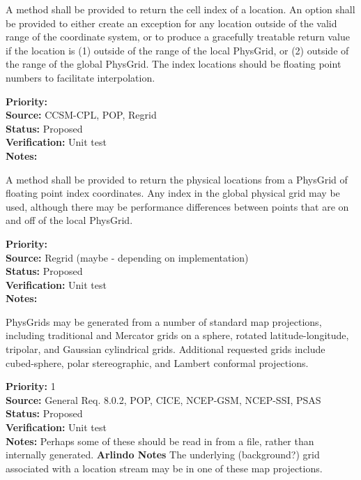 A method shall be provided to return the cell index of a location.  An option shall
be provided to either create an exception for any location outside of the valid
range of the coordinate system, or to produce a gracefully treatable return value if
the location is (1) outside of the range of the local PhysGrid, or (2) outside of the
range of the global PhysGrid.  The index locations should be floating point numbers to
facilitate interpolation.
\begin{reqlist}
{\bf Priority:} \\
{\bf Source:} CCSM-CPL, POP, Regrid \\
{\bf Status:} Proposed \\
{\bf Verification:} Unit test \\
{\bf Notes:} 
\end{reqlist}

A method shall be provided to return the physical locations from a PhysGrid of
floating point index coordinates.  Any index in the global physical grid may be
used, although there may be performance differences between points that are on
and off of the local PhysGrid.
\begin{reqlist}
{\bf Priority:} \\
{\bf Source:} Regrid (maybe - depending on implementation) \\
{\bf Status:} Proposed \\
{\bf Verification:} Unit test \\
{\bf Notes:} 
\end{reqlist}


PhysGrids may be generated from a number of standard map projections, including
traditional and Mercator grids on a sphere, rotated latitude-longitude,
tripolar, and Gaussian cylindrical grids.  Additional requested grids include 
cubed-sphere, polar stereographic, and Lambert conformal projections.
\begin{reqlist}
{\bf Priority:} 1 \\
{\bf Source:} General Req. 8.0.2, POP, CICE, NCEP-GSM, NCEP-SSI,
PSAS \\
{\bf Status:} Proposed \\
{\bf Verification:} Unit test\\
{\bf Notes:}  Perhaps some of these should be read in from a file, rather than
internally generated.
{\bf Arlindo Notes} The underlying (background?) grid associated with a location stream may be in one of these map projections.
\end{reqlist}

